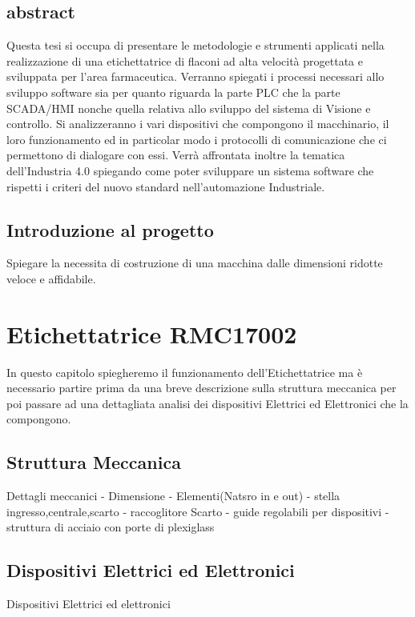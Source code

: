 \documentclass[12pt, a4paper, oneside]{book}
\begin{document}
\tableofcontents
{}

\newpage
\thispagestyle{empty}
\listoffigures

\newpage
\thispagestyle{empty}
\section*{abstract}
Questa tesi si occupa di presentare le metodologie e strumenti applicati nella realizzazione di una etichettatrice di flaconi ad alta velocità progettata e sviluppata per l'area farmaceutica.
Verranno spiegati i processi necessari allo sviluppo software sia per quanto riguarda la parte PLC che la parte SCADA/HMI nonche quella relativa allo sviluppo del sistema di Visione e controllo.
Si analizzeranno i vari dispositivi che compongono il macchinario, il loro funzionamento ed in particolar modo i protocolli di comunicazione che ci permettono di dialogare con essi. 
Verrà affrontata inoltre la tematica dell'Industria 4.0 spiegando come poter sviluppare un sistema software che rispetti i criteri del nuovo standard nell'automazione Industriale.
 

\newpage
\thispagestyle{empty}
\section*{Introduzione al progetto}
Spiegare la necessita di costruzione di una macchina dalle dimensioni ridotte veloce e affidabile. 

\chapter{Etichettatrice RMC17002}
In questo capitolo spiegheremo il funzionamento dell'Etichettatrice ma è necessario partire prima da una breve descrizione sulla struttura meccanica per poi passare ad una dettagliata analisi dei dispositivi Elettrici ed Elettronici che la compongono.
\section{Struttura Meccanica}
Dettagli meccanici - Dimensione - Elementi(Natsro in e out) - stella ingresso,centrale,scarto - raccoglitore Scarto - guide regolabili per dispositivi - struttura di acciaio con porte di plexiglass
\section{Dispositivi Elettrici ed Elettronici}
Dispositivi Elettrici ed elettronici
\end{document}
